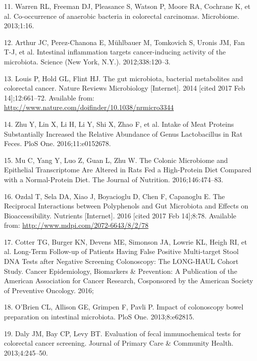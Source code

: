 \documentclass[12pt,]{article}
\begin{document}
\hypertarget{ref-warren_co-occurrence_2013}{}
11. Warren RL, Freeman DJ, Pleasance S, Watson P, Moore RA, Cochrane K,
et al. Co-occurrence of anaerobic bacteria in colorectal carcinomas.
Microbiome. 2013;1:16.

\hypertarget{ref-arthur_intestinal_2012}{}
12. Arthur JC, Perez-Chanona E, Mühlbauer M, Tomkovich S, Uronis JM, Fan
T-J, et al. Intestinal inflammation targets cancer-inducing activity of
the microbiota. Science (New York, N.Y.). 2012;338:120--3.

\hypertarget{ref-louis_gut_2014}{}
13. Louis P, Hold GL, Flint HJ. The gut microbiota, bacterial
metabolites and colorectal cancer. Nature Reviews Microbiology
{[}Internet{]}. 2014 {[}cited 2017 Feb 14{]};12:661--72. Available from:
\url{http://www.nature.com/doifinder/10.1038/nrmicro3344}

\hypertarget{ref-zhu_intake_2016}{}
14. Zhu Y, Lin X, Li H, Li Y, Shi X, Zhao F, et al. Intake of Meat
Proteins Substantially Increased the Relative Abundance of Genus
Lactobacillus in Rat Feces. PloS One. 2016;11:e0152678.

\hypertarget{ref-mu_colonic_2016}{}
15. Mu C, Yang Y, Luo Z, Guan L, Zhu W. The Colonic Microbiome and
Epithelial Transcriptome Are Altered in Rats Fed a High-Protein Diet
Compared with a Normal-Protein Diet. The Journal of Nutrition.
2016;146:474--83.

\hypertarget{ref-ozdal_reciprocal_2016}{}
16. Ozdal T, Sela DA, Xiao J, Boyacioglu D, Chen F, Capanoglu E. The
Reciprocal Interactions between Polyphenols and Gut Microbiota and
Effects on Bioaccessibility. Nutrients {[}Internet{]}. 2016 {[}cited
2017 Feb 14{]};8:78. Available from:
\url{http://www.mdpi.com/2072-6643/8/2/78}

\hypertarget{ref-cotter_long-term_2016}{}
17. Cotter TG, Burger KN, Devens ME, Simonson JA, Lowrie KL, Heigh RI,
et al. Long-Term Follow-up of Patients Having False Positive
Multi-target Stool DNA Tests after Negative Screening Colonoscopy: The
LONG-HAUL Cohort Study. Cancer Epidemiology, Biomarkers \& Prevention: A
Publication of the American Association for Cancer Research, Cosponsored
by the American Society of Preventive Oncology. 2016;

\hypertarget{ref-obrien_impact_2013}{}
18. O'Brien CL, Allison GE, Grimpen F, Pavli P. Impact of colonoscopy
bowel preparation on intestinal microbiota. PloS One. 2013;8:e62815.

\hypertarget{ref-daly_evaluation_2013}{}
19. Daly JM, Bay CP, Levy BT. Evaluation of fecal immunochemical tests
for colorectal cancer screening. Journal of Primary Care \& Community
Health. 2013;4:245--50.
\end{document}
